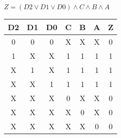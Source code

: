 
\begin{center}
    {\(Z = (D2 \lor D1 \lor D0) \land C \land B \land A \)}
    \begin{table}[h] %
        \begin{center}
            \begin{tabular}{|c|c|c|c|c|c||c|} \hline
            D2 & D1 & D0 & C & B & A & Z \\ \hline\hline
            0  & 0  & 0  & X & X & X & 0 \\ \hline
            1  & X  & X  & 1 & 1 & 1 & 1 \\ \hline
            X  & 1  & X  & 1 & 1 & 1 & 1 \\ \hline
            X  & X  & 1  & 1 & 1 & 1 & 1 \\ \hline
            X  & X  & X  & 0 & X & X & 0 \\ \hline
            X  & X  & X  & X & 0 & X & 0 \\ \hline
            X  & X  & X  & X & X & 0 & 0 \\ \hline
            \end{tabular}
        \end{center}
    \end{table}
\end{center}
